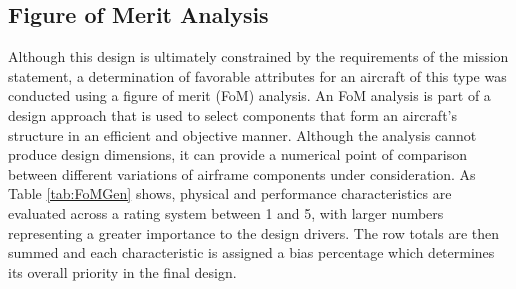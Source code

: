 \documentclass[titlepage]{article}
\begin{document}
\begin{appendices}
\section{Figure of Merit Analysis}
Although this design is ultimately constrained by the requirements of the mission statement, a determination of favorable attributes for an aircraft of this type was conducted using a figure of merit (FoM) analysis. An FoM analysis is part of a design approach that is used to select components that form an aircraft's structure in an efficient and objective manner. Although the analysis cannot produce design dimensions, it can provide a numerical point of comparison between different variations of airframe components under consideration. As Table \ref{tab:FoMGen} shows, physical and performance characteristics are evaluated across a rating system between 1 and 5, with larger numbers representing a greater importance to the design drivers. The row totals are then summed and each characteristic is assigned a bias percentage which determines its overall priority in the final design. 


\begin{table}[h!]
\caption{Figures of Merit for Aircraft Performance}
\label{tab:FoMGen}
\end{table}


\end{appendices}
\end{document}
